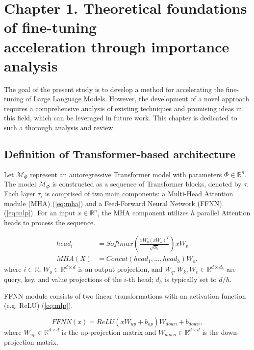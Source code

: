 \section*{Chapter 1. Theoretical foundations of fine-tuning \\ acceleration through importance analysis}
\setcounter{section}{1}

    The goal of the present study is to develop a method for accelerating the fine-tuning of Large Language Models. However, the development of a novel approach requires a comprehensive analysis of existing techniques and promising ideas in this field, which can be leveraged in future work. This chapter is dedicated to such a thorough analysis and review.
    
    \subsection{Definition of Transformer-based architecture}
    Let $\mathcal{M}_\Phi$ represent an autoregressive Transformer model with parameters $\Phi \in \mathbb{R}^n$. The model $\mathcal{M}_\Phi$ is constructed as a sequence of Transformer blocks, denoted by $\tau$. Each layer $\tau_i$ is comprised of two main components: a Multi-Head Attention module (MHA) (\ref{eq:mha}) and a Feed-Forward Neural Network (FFNN) (\ref{eq:mlp}). For an input $x \in \mathbb{R}^n$, the MHA component utilizes $h$ parallel Attention heads to process the sequence.

    \begin{equation}\label{eq:mha}
    \begin{aligned}
        head_i & = Softmax(\frac{xW_q (xW_k)^T}{\sqrt{d_h}})xW_v \\
        MHA (X) & = Concat (head_1, \dots , head_h)W_o, 
    \end{aligned}
    \end{equation}
    where $i \in \mathbb{R}$, $W_o \in \mathbb{R}^{d \times d}$ is an output projection, and \(W_q, W_k, W_v \in \mathbb{R}^{d \times d_h}\) are query, key, and value projections of the $i$-th head; $d_h$ is typically set to $d/h$. 
    
    FFNN module consists of two linear transformations with an activation function (e.g. ReLU) (\ref{eq:mlp}). 

    \begin{equation}\label{eq:mlp}
        FFNN(x) = ReLU(xW_{up} + b_{up})W_{down} + b_{down}, 
    \end{equation}
    where $W_{up} \in \mathbb{R}^{d \times d}$ is the up-projection matrix and $W_{down} \in \mathbb{R}^{d \times d}$ is the down-projection matrix. 

